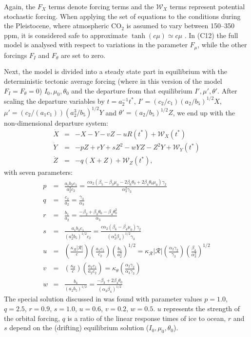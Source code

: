 \documentclass[12pt]{article}
\def\ba{\begin{eqnarray}}
\def\ea{\end{eqnarray}}
\begin{document}
Again, the $F_X$ terms denote forcing terms and the $\mathcal{W}_X$ terms represent potential stochastic forcing. When applying the set of equations to the conditions during the Pleistocene, where atmospheric CO$_2$ is assumed to vary between 150--350 ppm, it is considered safe to approximate $\tanh(c\mu)\simeq c\mu$ \cite{Saltzman:1990uy}. In \cite{Crucifix2012a} (C12) the full model is analysed with respect to variations in the parameter $F_{\mu}$, while the other forcings $F_{I}$ and $F_{\theta}$ are set to zero. 

Next, the model is divided into a steady state part in equilibrium with the deterministic tectonic average forcing (where in this version of the model $F_I = F_{\theta} = 0$) $I_0, \mu_0, \theta_0$ and the departure from that equilibrium $I', \mu',\theta'$. After scaling the departure variables by $t = a_2^{-1}t^*$, $I'=(c_2/c_1)(a_2/b_5)^{1/2}X$, $\mu' = (c_2/(a_1c_1))(a_2^3/b_5)^{1/2}Y$ and $\theta' = (a_2/b_5)^{1/2}Z$, we end up with the non-dimensional departure system:
\ba
\dot X &=& -X -Y-vZ-uR(t^*)+\mathcal{W}_X(t^*)\\
\dot Y &=& -pZ + rY +sZ^2 -wYZ-Z^2 Y+\mathcal{W}_Y(t^*)\\
\dot Z &=& -q(X+Z)+\mathcal{W}_Z(t^*),
\label{e:SM90anom}
\ea
with seven parameters:
\ba
p &=& \frac{a_1b_2c_1}{a_2^2c_2}=\frac{c\alpha_2(\beta_5-\beta_3\mu_0-2\beta_6\theta_0+2\beta_4\theta_0\mu_0)\gamma_2}{\alpha_3^2\gamma_3}
\nonumber\\
q &=&\frac{c_2}{a_2}=\frac{\gamma_3}{\alpha_3}
\nonumber\\
r &=&\frac{b_1}{a_2}=\frac{-\beta_2+\beta_3\theta_0-\beta_4\theta_0^2}{\alpha_3}
\nonumber\\
s &=&\frac{a_1b_3c_1}{(a_2^3 b_5)^{1/2}c_2} = \frac{c\alpha_2(\beta_6-\beta_4\mu_0)\gamma_2}{(\alpha_3^3\beta_4)^{1/2}\gamma_3}
\nonumber\\
u &=& \left(\frac{\kappa_\mathcal{R}|\mathcal{R}|}{c}\right)\left(\frac{a_1c_1}{c_2}\right)\left(\frac{b_5}{a_2^3}\right)^{1/2} = \kappa_\mathcal{R}|\mathcal{R}|\left(\frac{\alpha_2\gamma_2}{\gamma_3}\right)\left(\frac{\beta_4}{\alpha_3^3}\right)^{1/2}
\nonumber\\
v &=& \left(\frac{\kappa_\theta}{c}\right)\left(\frac{a_1c_1}{a_2 c_2}\right) = \kappa_\theta\left(\frac{\alpha_2\gamma_2}{\alpha_3\gamma_3}\right)
\nonumber\\
w &=& \frac{b_4}{(a_2 b_5)^{1/2}} = \frac{-\beta_3+2\beta_4\theta_0}{(\alpha_3\beta_4)^{1/2}}\nonumber
\ea
The special solution discussed in \cite{Saltzman:1990uy} was found with parameter values $p=1.0$, $q=2.5$, $r=0.9$, $s=1.0$, $u=0.6$, $v=0.2$, $w=0.5$. $u$ represents the strength of the orbital forcing, $q$ is a ratio of the linear response times of ice to ocean, $r$ and $s$ depend on the (drifting) equilibrium solution ($I_0,\mu_0,\theta_0$).  
\end{document}

